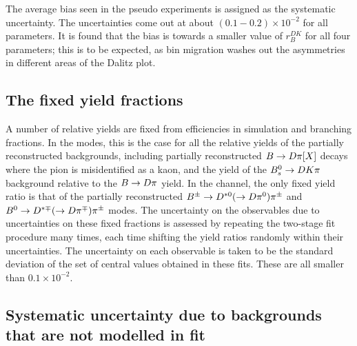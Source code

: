 The average bias seen in the pseudo experiments is assigned as the systematic uncertainty. The uncertainties come out at about $(0.1-0.2)\times 10^{-2}$ for all parameters. It is found that the bias is towards a smaller value of $r_B^{DK}$ for all four \DK parameters; this is to be expected, as bin migration washes out the asymmetries in different areas of the Dalitz plot. 





\subsection{The fixed yield fractions} %
\label{sub:the_bs_yield}

A number of relative yields are fixed from efficiencies in simulation and branching fractions. In the \DK modes, this is the case for all the relative yields of the partially reconstructed backgrounds, including partially reconstructed ${B}\rightarrow{\ensuremath{D}}\pi[X]$ decays where the pion is misidentified as a kaon, and the yield of the ${{B}^0_{s}}\rightarrow{\ensuremath{D}}{\ensuremath{K}}\pi$ background relative to the ${B}\rightarrow{\ensuremath{D}}\pi$ yield. In the \BtoDpi channel, the only fixed yield ratio is that of the partially reconstructed ${{B}^\pm}\rightarrow{\ensuremath{{D}^{*0}}}(\rightarrow{\ensuremath{D}}{\ensuremath{{\pi}^0}}){{\pi}^\pm}$ and ${{B}^0}\rightarrow{\ensuremath{{D}^{*\mp}}}(\rightarrow{\ensuremath{D}}{\ensuremath{{\pi}^\mp}}){{\pi}^\pm}$ modes. The uncertainty on the observables due to uncertainties on these fixed fractions is assessed by repeating the two-stage fit procedure many times, each time shifting the yield ratios randomly within their uncertainties. The uncertainty on each observable is taken to be the standard deviation of the set of central values obtained in these fits. These are all smaller than $0.1\times 10^{-2}$.


\subsection{Systematic uncertainty due to backgrounds that are not modelled in fit} %
\label{sub:systematic_uncertainty_due_to_backgrounds_that_are_not_modelled_in_fit}

